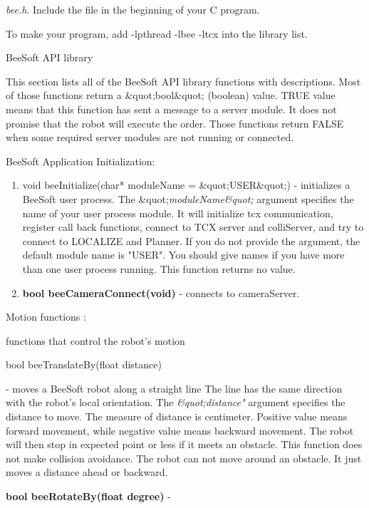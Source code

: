 {\it bee.h}. Include the file in the beginning of your C program.\par
\par To make your program, add -lpthread -lbee -ltcx into the library
list.\par \par BeeSoft API library\par \par This section lists all of
the BeeSoft API library functions with descriptions. Most of those
functions return a \&quot;bool\&quot; (boolean) value. TRUE value
means that this function has sent a message to a server module. It
does not promise that the robot will execute the order. Those
functions return FALSE when some required server modules are not
running or connected. \par {\bf \par BeeSoft Application
  Initialization:\par \begin{enumerate}\item void beeInitialize(char*
    moduleName = \&quot;USER\&quot;) - initializes a BeeSoft user
  process. The \&quot;{\it moduleName\&quot;} argument specifies the
  name of your user process module. It will initialize tcx
  communication, register call back functions, connect to TCX server
  and colliServer, and try to connect to LOCALIZE and Planner. If you
  do not provide the argument, the default module name is "USER". You
  should give names if you have more than one user process running.
  This function returns no value.\item {\bf bool
    beeCameraConnect(void)} - connects to cameraServer. 
\end{enumerate}{\bf \par Motion functions : }functions that control
the robot's motion\par \begin{enumerate}{\bf \item bool
    beeTranslateBy(float distance)} - moves a BeeSoft robot along a
  straight line The line has the same direction with the robot's local
  orientation. The {\it \&quot;distance"} argument specifies the
  distance to move. The measure of distance is centimeter. Positive
  value means forward movement, while negative value means backward
  movement. The robot will then stop in expected point or less if it
  meets an obstacle. This function does not make collision avoidance.
  The robot can not move around an obstacle. It just moves a distance
  ahead or backward. \item {\bf bool beeRotateBy(float degree)} -

\end{enumerate}}
